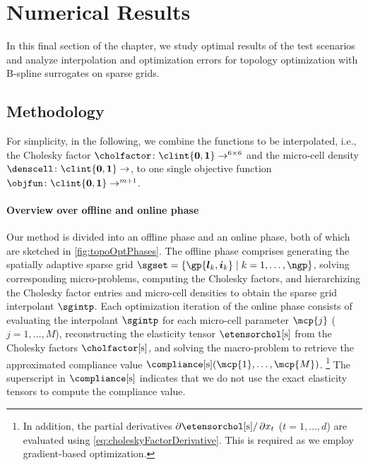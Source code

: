 \section{Numerical Results}
\label{sec:64results}


\noindent
In this final section of the chapter,
we study optimal results of the test scenarios and
analyze interpolation and optimization errors
for topology optimization with B-spline surrogates on sparse grids.



\subsection{Methodology}
\label{sec:641methodology}

For simplicity, in the following,
we combine the functions to be interpolated,
i.e., the Cholesky factor
$\cholfactor\colon \clint{\*0, \*1} \to \real^{6 \times 6}$ and
the micro-cell density $\denscell\colon \clint{\*0, \*1} \to \real$,
to one single objective function
$\*\objfun\colon \clint{\*0, \*1} \to \real^{m+1}$.

\paragraph{Overview over offline and online phase}

Our method is divided into an offline phase and an online phase,
both of which are sketched in \cref{fig:topoOptPhases}.
The offline phase comprises
generating the spatially adaptive sparse grid
$\sgset = \{\gp{\*l_k,\*i_k} \mid k = 1, \dotsc, \ngp\}$,
solving corresponding micro-problems,
computing the Cholesky factors, and
hierarchizing the Cholesky factor entries and micro-cell densities
to obtain the sparse grid interpolant $\*\sgintp$.
Each optimization iteration of the online phase consists of
evaluating the interpolant $\*\sgintp$
for each micro-cell parameter $\mcp{j}$ ($j = 1, \dotsc, M$),
reconstructing the elasticity tensor $\etensorcholintp$ from
the Cholesky factors $\cholfactorintp$, and
solving the macro-problem to retrieve the approximated compliance value
$\complianceintp(\mcp{1}, \dotsc, \mcp{M})$.%
\footnote{%
  In addition, the partial derivatives
  $\partialdiff{} \etensorcholintp/\partialdiff{} x_t$
  ($t = 1, \dotsc, d$)
  are evaluated using \cref{eq:choleskyFactorDerivative}.
  This is required as we employ gradient-based optimization.%
}
The superscript in $\complianceintp$ indicates that
we do not use the exact elasticity tensors to compute the compliance value.

